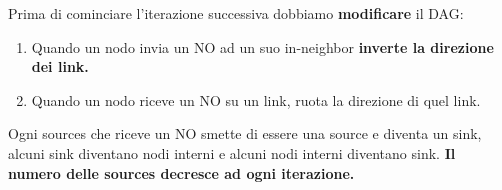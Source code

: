 \documentclass[12pt]{article}
\begin{document}
\begin{itemize}
\begin{enumerate}
				\end{enumerate}
				Prima di cominciare l'iterazione successiva dobbiamo \textbf{modificare} il DAG:
				\begin{enumerate}
					\item Quando un nodo invia un NO ad un suo in-neighbor \textbf{inverte la direzione dei link.}
					\item Quando un nodo riceve un NO su un link, ruota la direzione di quel link.
				\end{enumerate}
				Ogni sources che riceve un NO smette di essere una source e diventa un sink, alcuni sink diventano nodi interni e alcuni nodi interni diventano sink. \textbf{Il numero delle sources decresce ad ogni iterazione.} 
			 
			\end{itemize}
		
\end{document}
